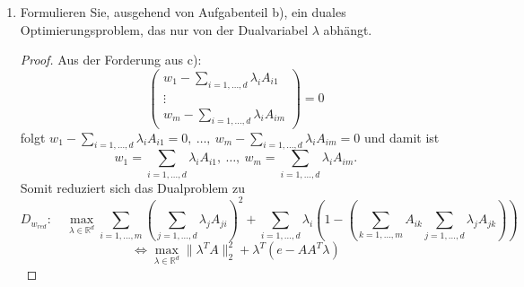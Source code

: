 \documentclass[12pt]{extreport} %
\newcommand{\R}{\mathbb{R}}
\theoremstyle{named}
\theoremstyle{nnamed}
\theoremstyle{itshape}
\theoremstyle{normal}
\begin{document}
\begin{enumerate}
\begin{proof}
\begin{align*}
			& = \left(\begin{array}{c} w_1 -\sum_{i=1,\dotsc,d}  \lambda_i A_{i1}  \\ \vdots \\ w_m -\sum_{i=1,\dotsc,d}  \lambda_i A_{im} \end{array}\right) 
			\end{align*}
		\end{proof}
	\item Formulieren Sie, ausgehend von Aufgabenteil b), ein duales Optimierungsproblem, das nur von der Dualvariabel $\lambda$ abhängt.
		\begin{proof}
			Aus der Forderung aus c):
			$$ \left(\begin{array}{c} w_1 -\sum_{i=1,\dotsc,d}  \lambda_i A_{i1}  \\ \vdots \\ w_m -\sum_{i=1,\dotsc,d}  \lambda_i A_{im} \end{array}\right)  = 0 $$
			folgt $w_1 -\sum_{i=1,\dotsc,d}  \lambda_i A_{i1} = 0, ~ \dotsc, ~ w_m -\sum_{i=1,\dotsc,d}  \lambda_i A_{im} = 0$ und damit ist $$w_1 = \sum_{i=1,\dotsc,d}  \lambda_i A_{i1}, ~ \dotsc, ~ w_m = \sum_{i=1,\dotsc,d}  \lambda_i A_{im}. $$
			Somit reduziert sich das Dualproblem zu
		 	$$ D_{w_{red}}: \quad \max_{\lambda \in \R^d} \sum_{i=1, \dotsc,m } \left( \sum_{j=1, \dotsc, d} \lambda_j A_{ji} \right)^2 + \sum_{i = 1, \dotsc, d} \lambda_i \left( 1 - \left(\sum_{k = 1, \dotsc, m} A_{ik}  \sum_{j=1, \dotsc, d} \lambda_j A_{jk} \right) \right) $$
		 	$$ \iff \max_{\lambda \in \R^d}\| \lambda^T A \|_2^2 +  \lambda^T \left( e - A A^T \lambda  \right)$$
		\end{proof}
\end{enumerate}
\end{document}

